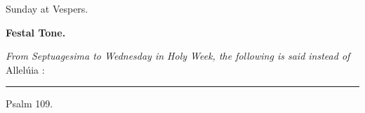 \documentclass[letterpaper,12pt]{article} %
\begin{document}

\begin{center}{\huge Sunday at Vespers.}\end{center}


\def\greinitialformat#1{%
{\fontsize{40}{40}\selectfont #1}%
}


{


{\bfseries Festal Tone.}

\large
{}}%
{\itshape From Septuagesima to Wednesday in Holy Week, the following is said instead of} Allelúia :

\smallskip
\hrule
\begin{center}{\Large Psalm 109.}\end{center}
\end{document}
